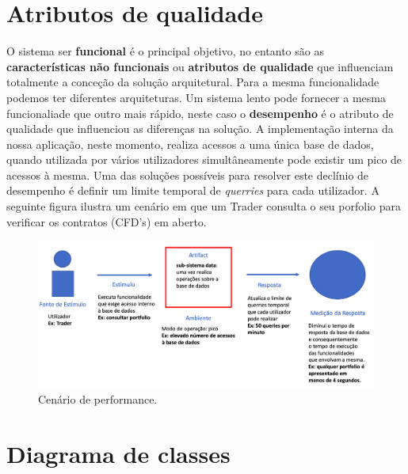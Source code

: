 \documentclass[11pt,a4paper]{report}%
\begin{document}
\newpage

\section{Atributos de qualidade}

O sistema ser \textbf{funcional} é o principal objetivo, no entanto são as \textbf{características não funcionais} ou \textbf{atributos de qualidade} que influenciam totalmente a conceção da solução arquitetural. Para a mesma funcionalidade podemos ter diferentes arquiteturas. Um sistema lento pode fornecer a mesma funcionaliade que outro mais rápido, neste caso o \textbf{desempenho} é o atributo de qualidade que influenciou as diferenças na solução.
\newline
\newline
A implementação interna da nossa aplicação, neste momento, realiza acessos a uma única base de dados, quando utilizada por vários utilizadores simultâneamente pode existir um pico de acessos à mesma.
\newline
Uma das soluções possíveis para resolver este declínio de desempenho é definir um limite temporal de \emph{querries} para cada utilizador.
\newline 
A seguinte figura ilustra um cenário em que um Trader consulta o seu porfolio para verificar os contratos (CFD's) em aberto.

\begin{figure}[H]
	\centering
	\includegraphics[scale=0.35]{AQ_performace.png}
	\caption{Cenário de performance. }
	\label{img:pag}
\end{figure}

\newpage

\section{Diagrama de classes}
\end{document}
